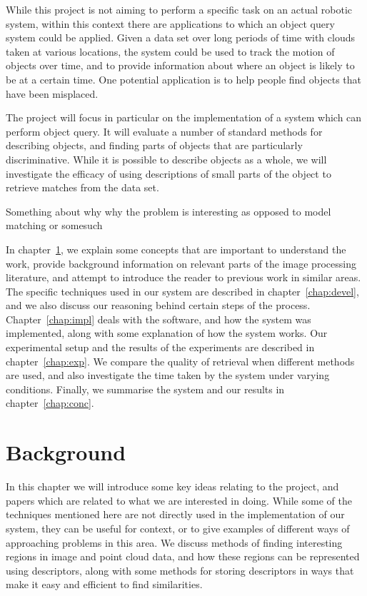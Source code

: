 \documentclass[11pt,a4paper]{kth-mag}
\begin{document}
While this project is not aiming to perform a specific task on an actual robotic
system, within this context there are applications to which an object query
system could be applied. Given a data set over long periods of time with clouds
taken at various locations, the system could be used to track the motion of
objects over time, and to provide information about where an object is likely to
be at a certain time. One potential application is to help people find objects
that have been misplaced.

The project will focus in particular on the implementation of a system which can
perform object query. It will evaluate a number of standard methods for
describing objects, and finding parts of objects that are particularly
discriminative. While it is possible to describe objects as a whole, we will
investigate the efficacy of using descriptions of small parts of the object to
retrieve matches from the data set.

Something about why why the problem is interesting as opposed to model matching
or somesuch

In chapter~\ref{chap:bg}, we explain some concepts that are important to
understand the work, provide background information on relevant parts of the
image processing literature, and attempt to introduce the reader to previous
work in similar areas. The specific techniques used in our system are described
in chapter~\ref{chap:devel}, and we also discuss our reasoning behind certain
steps of the process. Chapter~\ref{chap:impl} deals with the software, and how
the system was implemented, along with some explanation of how the system works.
Our experimental setup and the results of the experiments are described in
chapter~\ref{chap:exp}. We compare the quality of retrieval when different
methods are used, and also investigate the time taken by the system under
varying conditions. Finally, we summarise the system and our results in
chapter~\ref{chap:conc}.
\chapter{Background}
\label{chap:bg}
In this chapter we will introduce some key ideas relating to the project, and
papers which are related to what we are interested in doing. While some of the
techniques mentioned here are not directly used in the implementation of our
system, they can be useful for context, or to give examples of different ways of
approaching problems in this area. We discuss methods of finding interesting
regions in image and point cloud data, and how these regions can be represented
using descriptors, along with some methods for storing descriptors in ways that
make it easy and efficient to find similarities.
\end{document}
